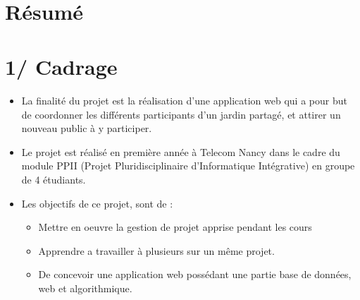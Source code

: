 \documentclass{report}
\begin{document}
\newpage



\begin{center}
    \textbf{\color{orange}{\Huge Charte-projet}} \\
    \textbf{\color{blue}{\Large Table des matières}}
\end{center}

\section*{Résumé}
\section*{1/ Cadrage}
\begin{itemize}
    \item La finalité du projet est la réalisation d'une application web qui a pour but de coordonner les différents participants d'un jardin partagé, et attirer un nouveau public à y participer.
    \item Le projet est réalisé en première année à Telecom Nancy dans le cadre du module PPII (Projet Pluridisciplinaire d'Informatique Intégrative) en groupe de 4 étudiants.
    \item Les objectifs de ce projet, sont de :  
    \begin{itemize}
        \item Mettre en oeuvre la gestion de projet apprise pendant les cours
        \item Apprendre a travailler à plusieurs sur un même projet.
        \item De concevoir une application web possédant une partie base de données, web et algorithmique.
    \end{itemize}
\end{itemize}
\end{document}
